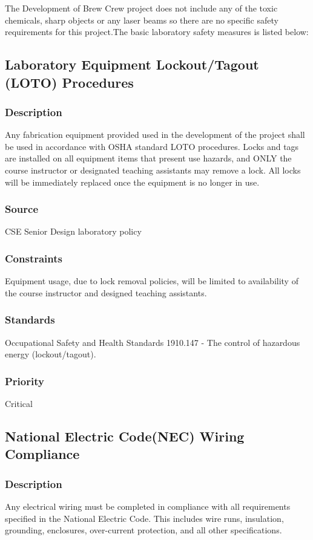 The Development of Brew Crew project does not include any of the toxic chemicals, sharp objects or any laser beams so there  are no specific safety requirements for this project.The basic laboratory safety measures is listed below:

\subsection{Laboratory Equipment Lockout/Tagout (LOTO) Procedures}
\subsubsection{Description}
Any fabrication equipment provided used in the development of the project shall be used in accordance with OSHA standard LOTO procedures. Locks and tags are installed on all equipment items that present use hazards, and ONLY the course instructor or designated teaching assistants may remove a lock. All
locks will be immediately replaced once the equipment is no longer in use.
\subsubsection{Source}
CSE Senior Design laboratory policy
\subsubsection{Constraints}
Equipment usage, due to lock removal policies, will be limited to availability of the course instructor and designed teaching assistants.

\subsubsection{Standards}
 Occupational Safety and Health Standards 1910.147 - The control of hazardous energy (lockout/tagout).
\subsubsection{Priority}
Critical

\subsection{National Electric Code(NEC) Wiring Compliance}
\subsubsection{Description}
Any electrical wiring must be completed in compliance with all requirements specified in the National Electric Code. This includes wire runs, insulation, grounding, enclosures, over-current protection, and all other specifications.
